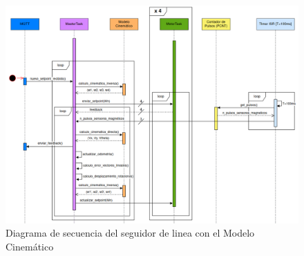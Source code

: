 \begin{figure}[H]
    \centering
    \hspace*{-1.25cm}
    \includegraphics[width=1.2\linewidth]{images/diag_secuencia_seguidor_linea_magnetica_modelo_cinem_compensado.png}
    \caption{Diagrama de secuencia del seguidor de linea con el Modelo Cinemático}
    \label{fig:diagsecuencialinefollowmodcin}
\end{figure}
